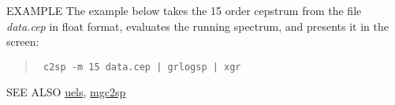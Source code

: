 \begin{options}
\end{options}

\begin{qsection}{EXAMPLE}
The example below takes the 15 order cepstrum from the file
 {\em data.cep} in float format, evaluates the running spectrum,
 and presents it in the screen:
\begin{quote}
 \verb! c2sp -m 15 data.cep | grlogsp | xgr ! 
\end{quote}
\end{qsection}

\begin{qsection}{SEE ALSO}
\hyperlink{uels}{uels},
\hyperlink{mgc2sp}{mgc2sp}
\end{qsection}
